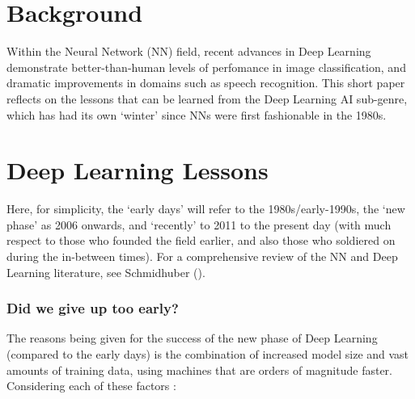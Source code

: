 \documentclass[citeauthoryear]{llncs}
\begin{document}
\section{Background}

Within the Neural Network (NN) field, 
recent advances in Deep Learning demonstrate better-than-human 
levels of perfomance in image classification, 
and dramatic improvements in domains such as speech recognition.  
This short paper reflects on the lessons that can be learned 
from the Deep Learning AI sub-genre, which has had its own `winter' 
since NNs were first fashionable in the 1980s.  

%
%
%

\section{Deep Learning Lessons}

Here, for simplicity, the `early days' will refer to the 1980s/early-1990s,
the `new phase' as 2006 onwards, and `recently' to 2011 to the present day
(with much respect to those who founded the field earlier, and also 
those who soldiered on during the in-between times).  
For a comprehensive review of the NN and Deep Learning literature, see Schmidhuber (\cite{SchmidhuberOverview}).
 

\subsubsection*{Did we give up too early?}
 
The reasons being given for the success of the new phase of Deep Learning 
(compared to the early days) is the combination of increased model size and 
vast amounts of training data, using machines that are orders of magnitude faster.  
Considering each of these factors :
\end{document}
